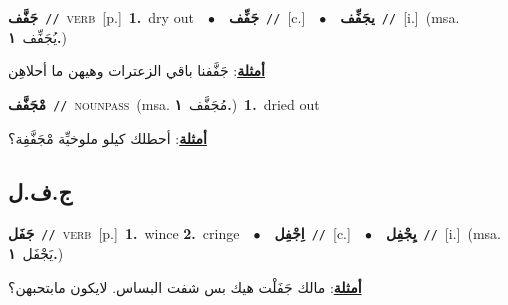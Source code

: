 \documentclass[10pt,a4paper,twoside]{article} %
\begin{document}
\begin{multicols}{2}
{\setlength\topsep{0pt}\textbf{\foreignlanguage{arabic}{جَفَّف}}\ {\color{gray}\texttt{//}\color{black}}\ \textsc{verb}\ [p.]\ \textbf{1.}~dry out\ \ $\bullet$\ \ \setlength\topsep{0pt}\textbf{\foreignlanguage{arabic}{جَفِّف}}\ {\color{gray}\texttt{//}\color{black}}\ [c.]\ \ $\bullet$\ \ \setlength\topsep{0pt}\textbf{\foreignlanguage{arabic}{يجَفِّف}}\ {\color{gray}\texttt{//}\color{black}}\ [i.]\ \color{gray}(msa. \foreignlanguage{arabic}{يُجَفِّف}~\foreignlanguage{arabic}{\textbf{١.}})\color{black}\  \begin{flushright}\color{gray}\foreignlanguage{arabic}{\textbf{\underline{\foreignlanguage{arabic}{أمثلة}}}: جَفَّفنا باقي الزعترات وهيهن ما أحلاهِن}\end{flushright}\color{black}} \vspace{2mm}

{\setlength\topsep{0pt}\textbf{\foreignlanguage{arabic}{مْجَفَّف}}\ {\color{gray}\texttt{//}\color{black}}\ \textsc{noun\textunderscore pass}\ \color{gray}(msa. \foreignlanguage{arabic}{مُجَفَّف}~\foreignlanguage{arabic}{\textbf{١.}})\color{black}\ \textbf{1.}~dried out\  \begin{flushright}\color{gray}\foreignlanguage{arabic}{\textbf{\underline{\foreignlanguage{arabic}{أمثلة}}}: أحطلك كيلو ملوخيِّة مْجَفَّفِة؟}\end{flushright}\color{black}} \vspace{2mm}

\vspace{-3mm}
\subsection*{\color{blue}\foreignlanguage{arabic}{ج.ف.ل}\color{blue}{}} 

{\setlength\topsep{0pt}\textbf{\foreignlanguage{arabic}{جَفَل}}\ {\color{gray}\texttt{//}\color{black}}\ \textsc{verb}\ [p.]\ \textbf{1.}~wince  \textbf{2.}~cringe\ \ $\bullet$\ \ \setlength\topsep{0pt}\textbf{\foreignlanguage{arabic}{اِجْفِل}}\ {\color{gray}\texttt{//}\color{black}}\ [c.]\ \ $\bullet$\ \ \setlength\topsep{0pt}\textbf{\foreignlanguage{arabic}{يِجْفِل}}\ {\color{gray}\texttt{//}\color{black}}\ [i.]\ \color{gray}(msa. \foreignlanguage{arabic}{يَجْفَل}~\foreignlanguage{arabic}{\textbf{١.}})\color{black}\  \begin{flushright}\color{gray}\foreignlanguage{arabic}{\textbf{\underline{\foreignlanguage{arabic}{أمثلة}}}: مالك جَفَلْت هيك بس شفت البساس. لايكون مابتحبهن؟}\end{flushright}\color{black}} \vspace{2mm}


\end{multicols}
\end{document}

